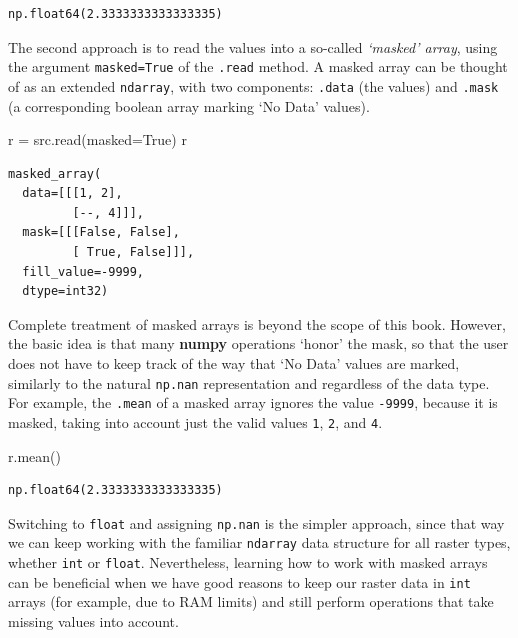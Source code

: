 \documentclass[
  letterpaper,
]{krantz}
\newenvironment{Shaded}{\begin{snugshade}}{\end{snugshade}}
\newcommand{\NormalTok}[1]{\textcolor[rgb]{0.00,0.23,0.31}{#1}}
\newcommand{\OperatorTok}[1]{\textcolor[rgb]{0.37,0.37,0.37}{#1}}
\newcommand{\VariableTok}[1]{\textcolor[rgb]{0.07,0.07,0.07}{#1}}
\begin{document}
\begin{verbatim}
np.float64(2.3333333333333335)
\end{verbatim}

The second approach is to read the values into a so-called
\emph{`masked' array}, using the argument \texttt{masked=True} of the
\texttt{.read} method. A masked array can be thought of as an extended
\texttt{ndarray}, with two components: \texttt{.data} (the values) and
\texttt{.mask} (a corresponding boolean array marking `No Data' values).

\begin{Shaded}
\begin{Highlighting}[]
\NormalTok{r }\OperatorTok{=}\NormalTok{ src.read(masked}\OperatorTok{=}\VariableTok{True}\NormalTok{)}
\NormalTok{r}
\end{Highlighting}
\end{Shaded}

\begin{verbatim}
masked_array(
  data=[[[1, 2],
         [--, 4]]],
  mask=[[[False, False],
         [ True, False]]],
  fill_value=-9999,
  dtype=int32)
\end{verbatim}

Complete treatment of masked arrays is beyond the scope of this book.
However, the basic idea is that many \textbf{numpy} operations `honor'
the mask, so that the user does not have to keep track of the way that
`No Data' values are marked, similarly to the natural \texttt{np.nan}
representation and regardless of the data type. For example, the
\texttt{.mean} of a masked array ignores the value \texttt{-9999},
because it is masked, taking into account just the valid values
\texttt{1}, \texttt{2}, and \texttt{4}.

\begin{Shaded}
\begin{Highlighting}[]
\NormalTok{r.mean()}
\end{Highlighting}
\end{Shaded}

\begin{verbatim}
np.float64(2.3333333333333335)
\end{verbatim}

Switching to \texttt{float} and assigning \texttt{np.nan} is the simpler
approach, since that way we can keep working with the familiar
\texttt{ndarray} data structure for all raster types, whether
\texttt{int} or \texttt{float}. Nevertheless, learning how to work with
masked arrays can be beneficial when we have good reasons to keep our
raster data in \texttt{int} arrays (for example, due to RAM limits) and
still perform operations that take missing values into account.
\end{document}
